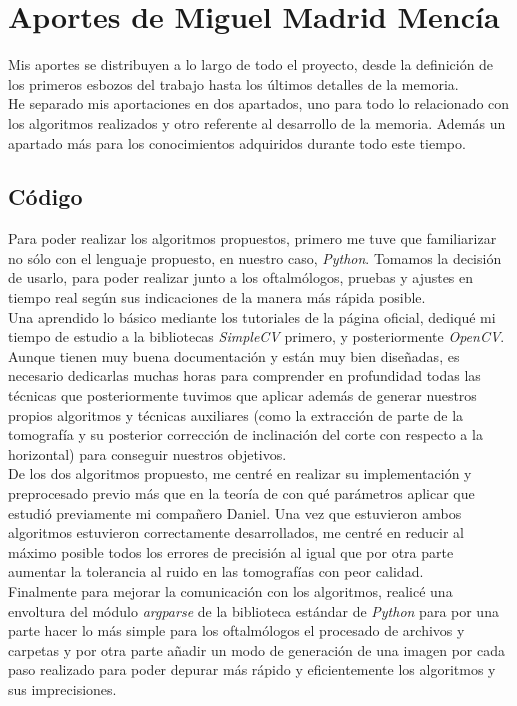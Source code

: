 \section{Aportes de Miguel Madrid Mencía}
Mis aportes se distribuyen a lo largo de todo el proyecto, desde la
definición de los primeros esbozos del trabajo hasta los últimos
detalles de la memoria.\\
He separado mis aportaciones en dos apartados, uno para todo lo
relacionado con los algoritmos realizados y otro referente al
desarrollo de la memoria. Además un apartado más para los
conocimientos adquiridos durante todo este tiempo.

\subsection{Código}
Para poder realizar los algoritmos propuestos, primero me tuve que
familiarizar no sólo con el lenguaje propuesto, en nuestro caso,
\emph{Python}. Tomamos la decisión de usarlo, para poder realizar
junto a los oftalmólogos, pruebas y ajustes en tiempo real según sus
indicaciones de la manera más rápida posible.\\
Una aprendido lo básico mediante los tutoriales de la página oficial,
dediqué mi tiempo de estudio a la bibliotecas \emph{SimpleCV} primero,
y posteriormente \emph{OpenCV}. Aunque tienen muy buena documentación
y están muy bien diseñadas, es necesario dedicarlas muchas horas para
comprender en profundidad todas las técnicas que posteriormente
tuvimos que aplicar además de generar nuestros propios algoritmos y
técnicas auxiliares (como la extracción de parte de la tomografía y su
posterior corrección de inclinación del corte con respecto a la
horizontal) para conseguir nuestros objetivos.\\
De los dos algoritmos propuesto, me centré en realizar su
implementación y preprocesado previo más que en la teoría de con qué
parámetros aplicar que estudió previamente mi compañero Daniel. Una
vez que estuvieron ambos algoritmos estuvieron correctamente
desarrollados, me centré en reducir al máximo posible todos los
errores de precisión al igual que por otra parte aumentar la
tolerancia al ruido en las tomografías con peor calidad.\\
Finalmente para mejorar la comunicación con los algoritmos, realicé
una envoltura del módulo \emph{argparse} de la biblioteca estándar de
\emph{Python} para por una parte hacer lo más simple para los
oftalmólogos el procesado de archivos y carpetas y por otra parte
añadir un modo de generación de una imagen por cada paso realizado
para poder depurar más rápido y eficientemente los algoritmos y sus
imprecisiones.

